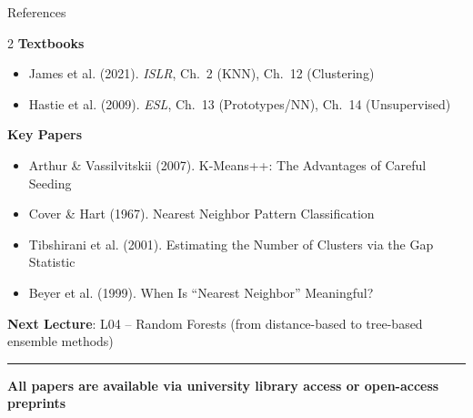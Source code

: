\documentclass[8pt,aspectratio=169]{beamer}
\newcommand{\bottomnote}[1]{%
\vfill
\vspace{-2mm}
\textcolor{mllavender2}{\rule{\textwidth}{0.4pt}}
\vspace{1mm}
\footnotesize
\textbf{#1}
}
\begin{document}
\begin{frame}[t]{References}
\begin{multicols}{2}
\textbf{Textbooks}
\begin{itemize}
\item James et al. (2021). \textit{ISLR}, Ch.\ 2 (KNN), Ch.\ 12 (Clustering)
\item Hastie et al. (2009). \textit{ESL}, Ch.\ 13 (Prototypes/NN), Ch.\ 14 (Unsupervised)
\end{itemize}

\columnbreak

\textbf{Key Papers}
\begin{itemize}
\item Arthur \& Vassilvitskii (2007). K-Means++: The Advantages of Careful Seeding
\item Cover \& Hart (1967). Nearest Neighbor Pattern Classification
\item Tibshirani et al. (2001). Estimating the Number of Clusters via the Gap Statistic
\item Beyer et al. (1999). When Is ``Nearest Neighbor'' Meaningful?
\end{itemize}
\end{multicols}
\vspace{0.5em}
\textbf{Next Lecture}: L04 -- Random Forests (from distance-based to tree-based ensemble methods)
\bottomnote{All papers are available via university library access or open-access preprints}
\end{frame}
\end{document}
